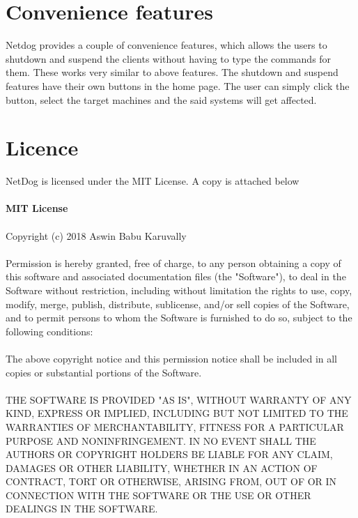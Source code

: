 \section{Convenience features}

Netdog provides a couple of convenience features, which allows the users to
shutdown and suspend the clients without having to type the commands for them.
These works very similar to above features. The shutdown and suspend features
have their own buttons in the home page. The user can simply click the button,
select the target machines and the said systems will get affected.

\newpage 

\section{Licence}
NetDog is licensed under the MIT License. A copy is attached below\\\\
\textbf{MIT License}\\\\
Copyright (c) 2018 Aswin Babu Karuvally\\\\
Permission is hereby granted, free of charge, to any person obtaining a copy
of this software and associated documentation files (the "Software"), to deal
in the Software without restriction, including without limitation the rights
to use, copy, modify, merge, publish, distribute, sublicense, and/or sell
copies of the Software, and to permit persons to whom the Software is
furnished to do so, subject to the following conditions:\\\\
The above copyright notice and this permission notice shall be included in all
copies or substantial portions of the Software.\\\\
THE SOFTWARE IS PROVIDED "AS IS", WITHOUT WARRANTY OF ANY KIND, EXPRESS OR
IMPLIED, INCLUDING BUT NOT LIMITED TO THE WARRANTIES OF MERCHANTABILITY,
FITNESS FOR A PARTICULAR PURPOSE AND NONINFRINGEMENT. IN NO EVENT SHALL THE 
AUTHORS OR COPYRIGHT HOLDERS BE LIABLE FOR ANY CLAIM, DAMAGES OR OTHER
LIABILITY, WHETHER IN AN ACTION OF CONTRACT, TORT OR OTHERWISE, ARISING FROM,
OUT OF OR IN CONNECTION WITH THE SOFTWARE OR THE USE OR OTHER DEALINGS IN THE 
SOFTWARE.

